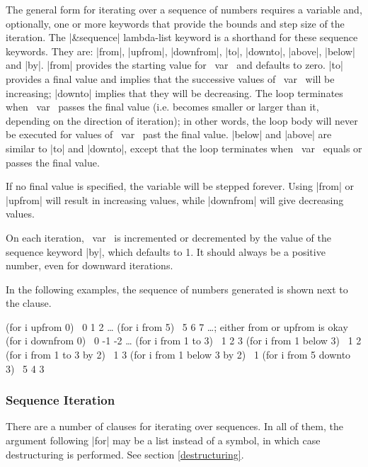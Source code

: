 \begin{clauses}
The general form for iterating over a sequence of numbers requires a
variable and, optionally, one or more keywords that provide the bounds
and step size of the iteration. The |\&sequence|
lambda-list keyword is a shorthand for these sequence keywords.  They are:
|from|, |upfrom|, |downfrom|, |to|, |downto|, |above|, |below| and |by|.
|from| provides the starting value for ~var~
and defaults to zero. |to| provides a final value and implies that the
successive values of ~var~ will be increasing; |downto| implies that
they will be decreasing.  The loop terminates when ~var~ passes
the final value (i.e. becomes smaller or larger than it, depending on
the direction of iteration); in other  words, the loop body
will never be
executed for values of ~var~ past the final value.
|below| and |above| are similar to |to| and
|downto|, except that the loop terminates when ~var~ equals or passes
the final value.

\cpar If no final value is specified, the variable will be stepped
forever.  Using |from| or |upfrom| will result in increasing
values, while |downfrom| will give decreasing values.

\cpar On each iteration,
~var~ is incremented or decremented by the value of the sequence
keyword |by|, which defaults to 1.  It should always be a positive
number, even for downward iterations.

\cpar In the following examples, the sequence of numbers generated is shown
next to the clause.

\begin{program}
(for i upfrom 0) \yields\ 0 1 2 \ldots
(for i from 5)   \yields\ 5 6 7 \ldots    ; either from or upfrom is okay
(for i downfrom 0) \yields\ 0 -1 -2 \ldots
(for i from 1 to 3) \yields\ 1 2 3
(for i from 1 below 3) \yields\ 1 2
(for i from 1 to 3 by 2) \yields\ 1 3
(for i from 1 below 3 by 2) \yields\ 1
(for i from 5 downto 3) \yields\ 5 4 3
\end{program}

\end{clauses}

\subsubsection{Sequence Iteration}

There are a number of clauses for iterating over sequences.  In all of
them, the argument following |for| may be a list instead of a
symbol, in which case destructuring is performed.  See section
\ref{destructuring}.

